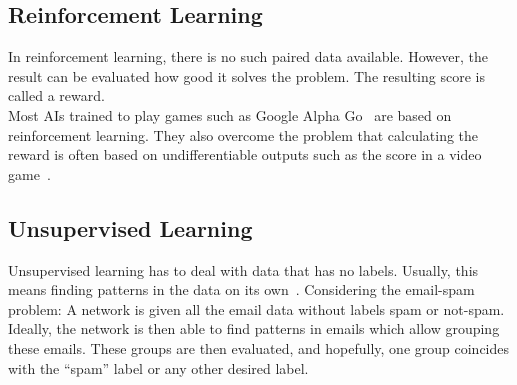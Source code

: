 \subsection{Reinforcement Learning}
In reinforcement learning, there is no such paired data available.
However, the result can be evaluated how good it solves the problem.
The resulting score is called a reward.\\
Most AIs trained to play games such as Google Alpha Go~\cite{alphago} are based on reinforcement learning.
They also overcome the problem that calculating the reward is often based on undifferentiable outputs such as the score in a video game~\cite{grosse}.

\subsection{Unsupervised Learning}
Unsupervised learning has to deal with data that has no labels.
Usually, this means finding patterns in the data on its own~\cite{grosse}.
Considering the email-spam problem: A network is given all the email data without labels spam or not-spam.
Ideally, the network is then able to find patterns in emails which allow grouping these emails.
These groups are then evaluated, and hopefully, one group coincides with the ``spam'' label or any other desired label.

